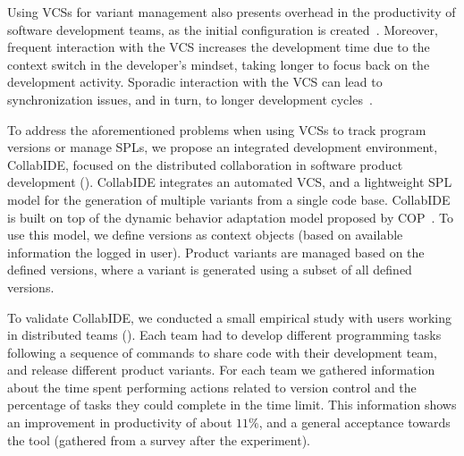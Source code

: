 Using \acp{VCS} for variant management also presents overhead in the productivity of software development teams, as the initial configuration is created~\cite{niu14}.
Moreover, frequent interaction with the \ac{VCS} increases the development time due to the context switch in the developer's mindset, taking longer to focus back on the development activity. Sporadic interaction with the \ac{VCS} can lead to synchronization issues, and in turn, to longer development cycles~\cite{schwagerl15}.  

To address the aforementioned problems when using \acp{VCS} to track program versions or manage \acp{SPL}, we propose an integrated development environment, CollabIDE, focused on the distributed  collaboration in software product development (). CollabIDE integrates an automated \ac{VCS}, and a lightweight \ac{SPL} model for the generation of multiple variants from a single code base. 
CollabIDE is built on top of the dynamic behavior adaptation model proposed by \ac{COP}~\cite{salvaneschi+12survey}. To use this model, we define versions as context objects (based on available information \eg the logged in user).
Product variants are managed based on the defined versions, where a variant is generated using a subset of all defined versions.

To validate CollabIDE, we conducted a small empirical study with users working in distributed teams 
(). Each team had to develop different programming tasks following a sequence of 
commands to share code with their development team, and release different product variants. For each 
team we gathered information about the time spent performing actions related to version control and the 
percentage of tasks they could complete in the time limit. This information shows an improvement in 
productivity of about $11\%$, and a general acceptance towards the tool (gathered from a survey after 
the experiment).

 

\endinput

With CollabIDE, we aim to solve the overhead problems that exists in these development models with 
features that aim to reduce the time developers must spend doing actions related to version control or 
setting up a project that uses \acp{SPL}.
